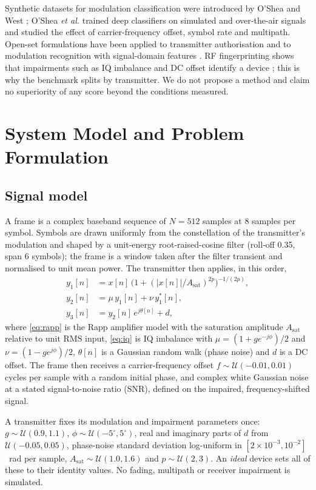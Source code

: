 \documentclass[journal]{IEEEtran}
\begin{document}
Synthetic datasets for modulation classification were introduced by O'Shea
and West \cite{oshea2016radioml}; O'Shea \emph{et al.} \cite{oshea2018ota}
trained deep classifiers on simulated and over-the-air signals and studied
the effect of carrier-frequency offset, symbol rate and multipath. Open-set
formulations have been applied to transmitter authorisation
\cite{hanna2021openset} and to modulation recognition with signal-domain
features \cite{li2023amosr}. RF fingerprinting shows that impairments such as
IQ imbalance and DC offset identify a device \cite{sankhe2019oracle}; this is
why the benchmark splits by transmitter. We do not propose a method and claim
no superiority of any score beyond the conditions measured.

\section{System Model and Problem Formulation}
\subsection{Signal model}
A frame is a complex baseband sequence of $N=512$ samples at 8 samples per
symbol. Symbols are drawn uniformly from the constellation of the
transmitter's modulation and shaped by a unit-energy root-raised-cosine
filter (roll-off 0.35, span 6 symbols); the frame is a window taken after the
filter transient and normalised to unit mean power. The transmitter then
applies, in this order,
\begin{align}
y_1[n] &= x[n]\,\bigl(1+(|x[n]|/A_\mathrm{sat})^{2p}\bigr)^{-1/(2p)}, \label{eq:rapp}\\
y_2[n] &= \mu\,y_1[n]+\nu\,y_1^{*}[n], \label{eq:iq}\\
y_3[n] &= y_2[n]\,e^{j\theta[n]}+d, \label{eq:pn}
\end{align}
where \eqref{eq:rapp} is the Rapp amplifier model \cite{rapp1991hpa} with the
saturation amplitude $A_\mathrm{sat}$ relative to unit RMS input,
\eqref{eq:iq} is IQ imbalance with $\mu=(1+g e^{-j\phi})/2$ and
$\nu=(1-g e^{j\phi})/2$, $\theta[n]$ is a Gaussian random walk (phase noise)
and $d$ is a DC offset. The frame then receives a carrier-frequency offset
$f\sim\mathcal{U}(-0.01,0.01)$ cycles per sample with a random initial phase,
and complex white Gaussian noise at a stated signal-to-noise ratio (SNR),
defined on the impaired, frequency-shifted signal.

A transmitter fixes its modulation and impairment parameters once:
$g\sim\mathcal{U}(0.9,1.1)$, $\phi\sim\mathcal{U}(-5^\circ,5^\circ)$, real and
imaginary parts of $d$ from $\mathcal{U}(-0.05,0.05)$, phase-noise standard
deviation log-uniform in $[2\times10^{-3},10^{-2}]$~rad per sample,
$A_\mathrm{sat}\sim\mathcal{U}(1.0,1.6)$ and $p\sim\mathcal{U}(2,3)$. An
\emph{ideal} device sets all of these to their identity values. No fading,
multipath or receiver impairment is simulated.
\end{document}
